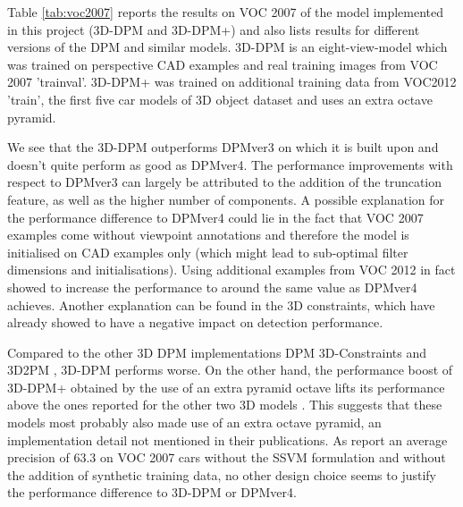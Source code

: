 Table \ref{tab:voc2007} reports the results on VOC 2007 of the model implemented in this project (3D-DPM and 3D-DPM+) and also lists results for different versions of the DPM and similar models. 3D-DPM is an eight-view-model  which was trained on perspective CAD examples and real training images from VOC 2007 'trainval'. 3D-DPM+ was trained on additional training data from VOC2012 'train', the first five car models of 3D object dataset and uses an extra octave pyramid. 

We see that the 3D-DPM outperforms DPMver3 on which it is built upon and doesn't quite perform as good as DPMver4. The performance improvements with respect to DPMver3 can largely be attributed to the addition of the truncation feature, as well as the higher number of components. A possible explanation for the performance difference to DPMver4 could lie in the fact that VOC 2007 examples come without viewpoint annotations and therefore the model is initialised on CAD examples only (which might lead to sub-optimal filter dimensions and initialisations). Using additional examples from VOC 2012 in fact showed to increase the performance to around the same value as DPMver4 achieves. Another explanation can be found in the 3D constraints, which have already showed to have a negative impact on detection performance.

Compared to the other 3D DPM implementations DPM 3D-Constraints \cite{6248075} and 3D2PM \cite{Pepik:2012aa}, 3D-DPM performs worse. On the other hand, the performance boost of 3D-DPM+ obtained by the use of an extra pyramid octave lifts its performance above the ones reported for the other two 3D models \cite{Pepik:2012aa} \cite{6248075}. This suggests that these models most probably also made use of an extra octave pyramid, an implementation detail not mentioned in their publications. As \cite{6248075} report an average precision of 63.3 on VOC 2007 cars without the SSVM formulation and without the addition of synthetic training data, no other design choice seems to justify the performance difference to 3D-DPM or DPMver4. 

\begin{table}[]
\caption{Average precision and average viewpoint accuracy (AP/VA) on cars of the VOC 2012 'val' set with annotations by \cite{xiang_wacv14}.}\label{tab:voc2012}
\end{table}

